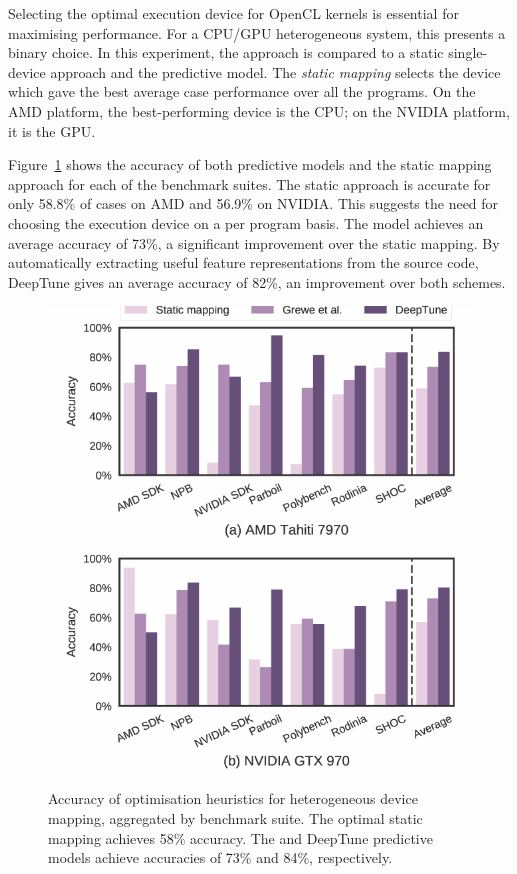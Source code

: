 Selecting the optimal execution device for OpenCL kernels is essential for maximising performance. For a CPU/GPU heterogeneous system, this presents a binary choice. In this experiment, the approach is compared to a static single-device approach and the \citeauthor{Grewe2013} predictive model. The \emph{static mapping} selects the device which gave the best average case performance over all the programs. On the AMD platform, the best-performing device is the CPU; on the NVIDIA platform, it is the GPU.

Figure~\ref{fig:cgo-accuracy} shows the accuracy of both predictive models and the static mapping approach for each of the benchmark suites. The static approach is accurate for only 58.8\% of cases on AMD and 56.9\% on NVIDIA. This suggests the need for choosing the execution device on a per program basis. The \citeauthor{Grewe2013} model achieves an average accuracy of 73\%, a significant improvement over the static mapping. By automatically extracting useful feature representations from the source code, DeepTune gives an average accuracy of 82\%, an improvement over both schemes.

\begin{figure}
  \centering %
  \includegraphics[width=.85\columnwidth]{img/cgo-acc}%
  \caption[Accuracy of optimisation heuristics for heterogeneous device mapping]{%
    Accuracy of optimisation heuristics for heterogeneous device mapping, aggregated by benchmark suite. The optimal static mapping achieves 58\% accuracy. The \citeauthor{Grewe2013} and DeepTune predictive models achieve accuracies of 73\% and 84\%, respectively.%
  }
  \label{fig:cgo-accuracy}
\end{figure}

